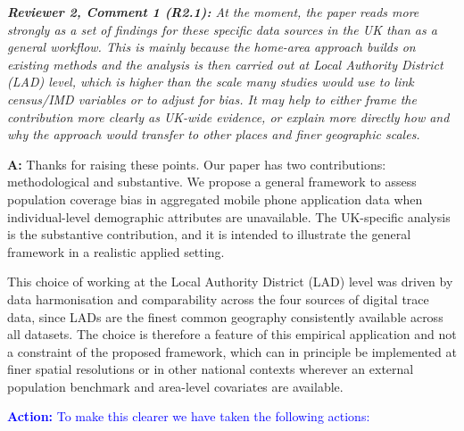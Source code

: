 \documentclass[
  letterpaper,
  DIV=11,
  numbers=noendperiod]{scrartcl}
\begin{document}
\setlength{\leftskip}{0cm}\textit{\textbf{Reviewer 2, Comment 1 (R2.1):} At the moment, the paper reads more strongly as a set of findings for these specific data sources in the UK than as a general workflow. This is mainly because the home-area approach builds on existing methods and the analysis is then carried out at Local Authority District (LAD) level, which is higher than the scale many studies would use to link census/IMD variables or to adjust for bias. It may help to either frame the contribution more clearly as UK-wide evidence, or explain more directly how and why the approach would transfer to other places and finer geographic scales.}

\setlength{\leftskip}{0.5cm}\textbf{A:} Thanks for raising these points.
Our paper has two contributions: methodological and substantive. We
propose a general framework to assess population coverage bias in
aggregated mobile phone application data when individual-level
demographic attributes are unavailable. The UK-specific analysis is the
substantive contribution, and it is intended to illustrate the general
framework in a realistic applied setting.

This choice of working at the Local Authority District (LAD) level was
driven by data harmonisation and comparability across the four sources
of digital trace data, since LADs are the finest common geography
consistently available across all datasets. The choice is therefore a
feature of this empirical application and not a constraint of the
proposed framework, which can in principle be implemented at finer
spatial resolutions or in other national contexts wherever an external
population benchmark and area-level covariates are available.

\setlength{\leftskip}{0.5cm}\textcolor{blue}{\textbf{Action:} To make this clearer we have taken the following actions:}
\end{document}
